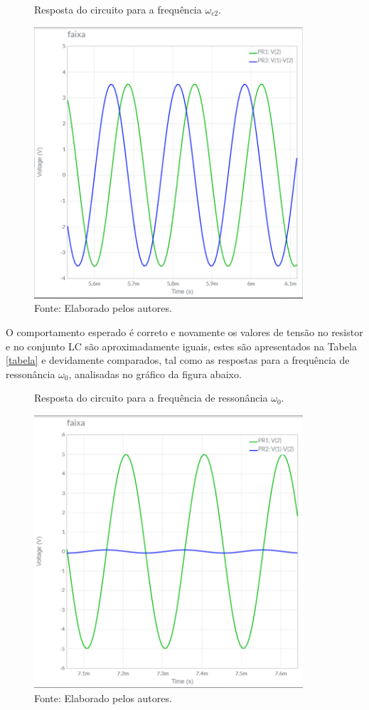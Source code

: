 \begin{figure}[H]
	\centering
	\caption{Resposta do circuito para a frequência $\omega_{c2}$.}
	\includegraphics[width=10cm]{images/f_c2.png}
	\caption*{Fonte: Elaborado pelos autores.}
	\label{c2}
\end{figure}

O comportamento esperado é correto e novamente os valores de tensão no resistor e no conjunto LC são aproximadamente iguais, estes são apresentados na Tabela \ref{tabela} e devidamente comparados, tal como as respostas para a frequência de ressonância $\omega_0$, analisadas no gráfico da figura abaixo.

\begin{figure}[H]
	\centering
	\caption{Resposta do circuito para a frequência de ressonância $\omega_0$.}
	\includegraphics[width=10cm]{images/f_ressonancia.png}
	\caption*{Fonte: Elaborado pelos autores.}
	\label{ressonancia}
\end{figure}

